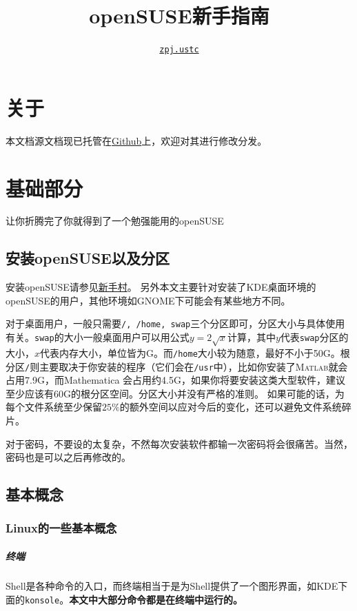 \documentclass[11pt,openany]{book}
\newcommand{\command}[1]{\texttt{\textcolor{codec}{#1}}}
\newcommand{\soft}[1]{\texttt{\textcolor{dgreen}{#1}}}
\newcommand{\emp}[1]{\textbf{#1}}
\begin{document}
\title{openSUSE新手指南}
\author{\href{mailto:zpj.ustc@gmail.com}{\texttt{zpj.ustc}}}
\maketitle
\chapter*{关于}


本文档源文档现已托管在\href{https://github.com/zpj-ustc/openSUSE-novice-guide}{Github}上，欢迎对其进行修改分发。
\tableofcontents

\chapter{基础部分}
让你折腾完了你就得到了一个勉强能用的openSUSE
\section{安装openSUSE以及分区}
安装openSUSE请参见\href{https://zh.opensuse.org/%E6%96%B0%E6%89%8B%E6%9D%91}{新手村}。
另外本文主要针对安装了KDE桌面环境的openSUSE的用户，其他环境如GNOME下可能会有某些地方不同。

对于桌面用户，一般只需要\command{/, /home, swap}三个分区即可，分区大小与具体使用有关。\command{swap}的大小一般桌面用户可以用公式$y=2\sqrt{x}$计算，其中$y$代表\command{swap}分区的大小，$x$代表内存大小，单位皆为G。而\command{/home}大小较为随意，最好不小于50G。根分区\command{/}则主要取决于你安装的程序（它们会在\command{/usr}中），比如你安装了\textsc{Matlab}就会占用7.9G，而Mathematica 会占用约4.5G，如果你将要安装这类大型软件，建议至少应该有60G的根分区空间。分区大小并没有严格的准则。
如果可能的话，为每个文件系统至少保留$25\%$的额外空间以应对今后的变化，还可以避免文件系统碎片。

对于密码，不要设的太复杂，不然每次安装软件都输一次密码将会很痛苦。当然，密码也是可以之后再修改的。
\section{基本概念}
\subsection{Linux的一些基本概念}
\paragraph{终端} Shell是各种命令的入口，而终端相当于是为Shell提供了一个图形界面，如KDE下面的\soft{konsole}。\emp{本文中大部分命令都是在终端中运行的。}
\end{document}
